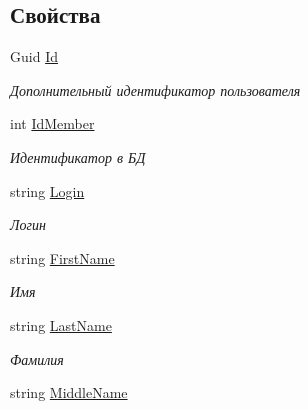\subsection*{Свойства}
\begin{DoxyCompactItemize}
\item 
Guid \hyperlink{interface_security_1_1_interfaces_1_1_model_1_1_i_user_a47431d79fd812a04f1c2a4a66b92889a}{Id}
\begin{DoxyCompactList}\small\item\em Дополнительный идентификатор пользователя \end{DoxyCompactList}\item 
int \hyperlink{interface_security_1_1_interfaces_1_1_model_1_1_i_user_a13269c7a77a0d1375f47b9340af23bf2}{Id\+Member}
\begin{DoxyCompactList}\small\item\em Идентификатор в БД \end{DoxyCompactList}\item 
string \hyperlink{interface_security_1_1_interfaces_1_1_model_1_1_i_user_a4895f64ca9c8b271684e344c5eb27cc7}{Login}
\begin{DoxyCompactList}\small\item\em Логин \end{DoxyCompactList}\item 
string \hyperlink{interface_security_1_1_interfaces_1_1_model_1_1_i_user_a67341c57dc480745fa2de8ba63573776}{First\+Name}
\begin{DoxyCompactList}\small\item\em Имя \end{DoxyCompactList}\item 
string \hyperlink{interface_security_1_1_interfaces_1_1_model_1_1_i_user_a64767161480a636912509e8cc9cbbf0c}{Last\+Name}
\begin{DoxyCompactList}\small\item\em Фамилия \end{DoxyCompactList}\item 
string \hyperlink{interface_security_1_1_interfaces_1_1_model_1_1_i_user_a7acd744d9980b3ec3a800ce217c3bf94}{Middle\+Name}

\end{DoxyCompactItemize}
